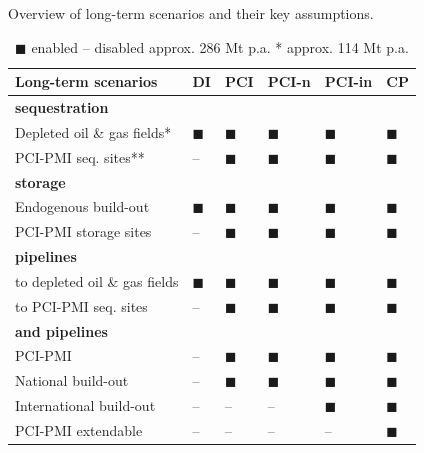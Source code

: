 \documentclass[preprint,12pt,sort&compress]{elsarticle}
\begin{document}
\begin{table}[htbp]
  \centering
  \caption{Overview of long-term scenarios and their key assumptions.}
  \label{tab:long-term_scenarios}
  \scriptsize
  \begin{tabularx}{\textwidth}{R{3.9cm}>{\centering\arraybackslash}X>{\centering\arraybackslash}X>{\centering\arraybackslash}X>{\centering\arraybackslash}X>{\centering\arraybackslash}X}
    \toprule
    \textbf{Long-term scenarios} & 
    \textbf{DI} & 
    \textbf{PCI} & 
    \textbf{PCI-n} & 
    \textbf{PCI-in} & 
    \textbf{CP} \\
    \midrule
    \textbf{ sequestration} & & & & & \\
    Depleted oil \& gas fields* & $\blacksquare$ & $\blacksquare$ & $\blacksquare$ & $\blacksquare$ & $\blacksquare$ \\
    PCI-PMI seq. sites** & -- & $\blacksquare$ & $\blacksquare$ & $\blacksquare$ & $\blacksquare$ \\
    \midrule
    \textbf{ storage} & & & & & \\
    Endogenous build-out & $\blacksquare$ & $\blacksquare$ & $\blacksquare$ & $\blacksquare$ & $\blacksquare$ \\
    PCI-PMI storage sites & -- & $\blacksquare$ & $\blacksquare$ & $\blacksquare$ & $\blacksquare$ \\
    \midrule
    \textbf{ pipelines} & & & & & \\
    to depleted oil \& gas fields & $\blacksquare$ & $\blacksquare$ & $\blacksquare$ & $\blacksquare$ & $\blacksquare$ \\
    to PCI-PMI seq. sites & -- & $\blacksquare$ & $\blacksquare$ & $\blacksquare$ & $\blacksquare$ \\
    \midrule
    \textbf{ and  pipelines} & & & & & \\
    PCI-PMI & -- & $\blacksquare$ & $\blacksquare$ & $\blacksquare$ & $\blacksquare$ \\
    National build-out & -- & $\blacksquare$ & $\blacksquare$ & $\blacksquare$ & $\blacksquare$ \\
    International build-out & -- & -- & -- & $\blacksquare$ & $\blacksquare$ \\
    PCI-PMI extendable & -- & -- & -- & -- & $\blacksquare$ \\

    \bottomrule
  \end{tabularx}
  \caption*{\scriptsize $\blacksquare$ enabled \quad -- disabled \quad * approx. 286 Mt p.a. \quad ** approx. 114 Mt p.a.}
\end{table}
\end{document}

